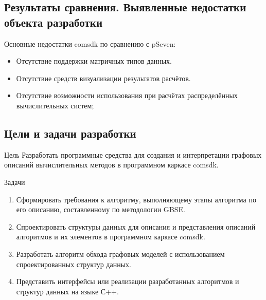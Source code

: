 \subsection{Результаты сравнения. Выявленные недостатки объекта разработки}
\begin{frame}
    Основные недостатки comsdk по сравнению с pSeven:
    \begin{itemize}
        \item Отсутствие поддержки матричных типов данных.
        \item Отсутствие средств визуализации результатов расчётов.
        \item Отсутствие возможности использования при расчётах распределённых вычислительных систем;
    \end{itemize}
\end{frame}

\subsection{Цели и задачи разработки}
\begin{frame}

    \begin{block}{Цель}
        Разработать программные средства для создания и интерпретации графовых описаний вычислительных методов в программном каркасе comsdk.
    \end{block}

    \begin{block}{Задачи}
        \begin{enumerate}
            \item Сформировать требования к алгоритму, выполняющему этапы алгоритма по его описанию, составленному по методологии GBSE.
            \item Спроектировать структуры данных для описания и представления описаний алгоритмов и их элементов в программном каркасе comsdk.
            \item Разработать алгоритм обхода графовых моделей с использованием спроектированных структур данных.
            \item Представить интерфейсы или реализации разработанных алгоритмов и структур данных на языке С++.
        \end{enumerate}
    \end{block}

\end{frame}